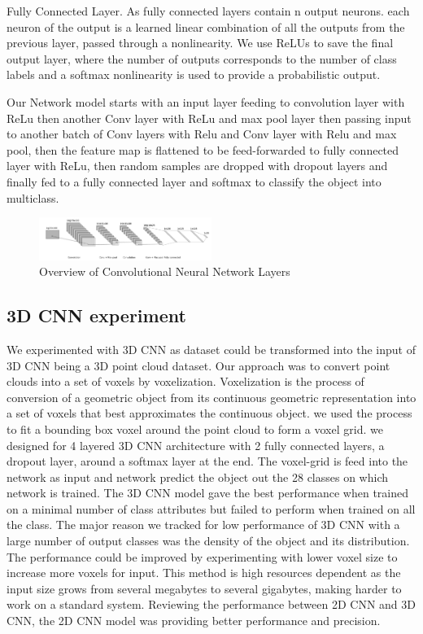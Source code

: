 Fully Connected Layer.
As fully connected layers contain n output neurons.
each neuron of the output is a learned linear combination of all the outputs from the previous layer,
passed through a nonlinearity.
We use ReLUs to save the final output layer, where the number of outputs corresponds
to the number of class labels and a softmax nonlinearity is used to provide a probabilistic output.


Our Network model starts with an input layer feeding to convolution layer with ReLu then
another Conv layer with ReLu and max pool layer then passing input to another batch of Conv layers
with Relu and Conv layer with Relu and max pool, then the feature map is flattened to be feed-forwarded to
fully connected layer with ReLu, then random samples are dropped with dropout layers
and finally fed to a fully connected layer and softmax to classify the object into multiclass.

\begin{figure}[!h]
     \begin{center}
       \includegraphics[width=0.5\textwidth]{./images/object_net.pdf}
       \caption{Overview of Convolutional Neural Network Layers}
       \label{fig:cnn}
     \end{center}
\end{figure}

\subsection{3D CNN experiment}
We experimented with 3D CNN as dataset could be transformed into the
input of 3D CNN being a 3D point cloud dataset. Our approach was to convert point clouds into a set of voxels by voxelization. Voxelization is the process of conversion of a geometric object from its
continuous geometric representation into a set of voxels that best approximates the continuous object. we used the process to fit a bounding box voxel around the point cloud to form a voxel grid. we designed for 4 layered 3D CNN architecture with 2 fully connected layers, a dropout layer, around a softmax layer at the end. The voxel-grid is feed into the network as input and network predict the object out the 28 classes on which network is trained. The 3D CNN model gave the best performance when trained on a minimal number of class attributes but failed to perform when trained on all the class. The major reason we tracked for low performance of 3D CNN with a large number of output classes was the
density of the object and its distribution.
The performance could be improved by experimenting with lower voxel size to increase more voxels for input. This method is high resources dependent as the input size grows from several megabytes to several gigabytes, making harder to work on a standard system. Reviewing the performance between 2D CNN and 3D CNN, the 2D CNN model was providing better performance and precision.
